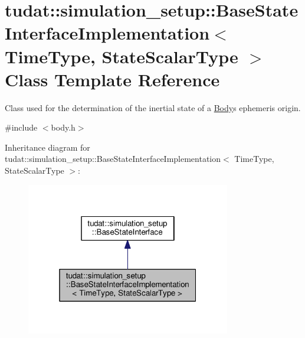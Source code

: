 \hypertarget{classtudat_1_1simulation__setup_1_1BaseStateInterfaceImplementation}{}\section{tudat\+:\+:simulation\+\_\+setup\+:\+:Base\+State\+Interface\+Implementation$<$ Time\+Type, State\+Scalar\+Type $>$ Class Template Reference}
\label{classtudat_1_1simulation__setup_1_1BaseStateInterfaceImplementation}


Class used for the determination of the inertial state of a \hyperlink{classtudat_1_1simulation__setup_1_1Body}{Body}\textquotesingle{}s ephemeris origin.  




{\ttfamily \#include $<$body.\+h$>$}



Inheritance diagram for tudat\+:\+:simulation\+\_\+setup\+:\+:Base\+State\+Interface\+Implementation$<$ Time\+Type, State\+Scalar\+Type $>$\+:
\nopagebreak
\begin{figure}[H]
\begin{center}
\leavevmode
\includegraphics[width=253pt]{classtudat_1_1simulation__setup_1_1BaseStateInterfaceImplementation__inherit__graph}
\end{center}
\end{figure}


